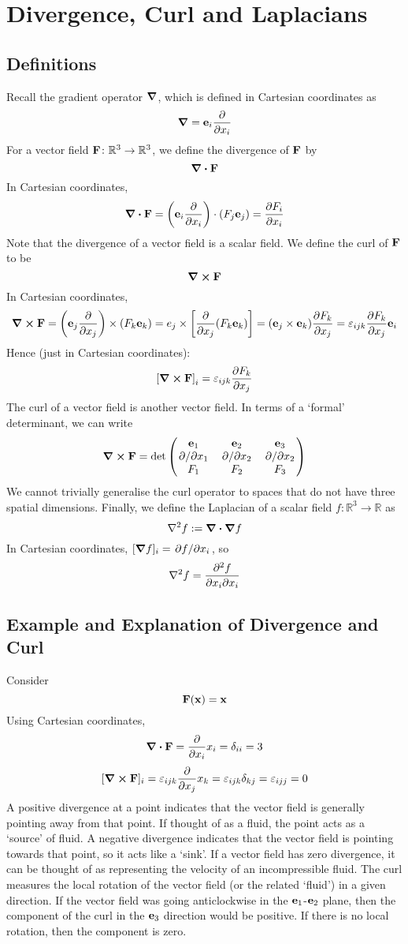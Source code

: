 \documentclass{article}
\begin{document}
\section{Divergence, Curl and Laplacians}
\subsection{Definitions}
Recall the gradient operator $\grad$, which is defined in Cartesian coordinates as
\[ \grad = \vb e_i \frac{\partial}{\partial x_i} \]
For a vector field $\vb F \colon \mathbb R^3 \to \mathbb R^3$, we define the divergence of $\vb F$ by
\[ \div{\vb F} \]
In Cartesian coordinates,
\[ \div{\vb F} = \left( \vb e_i \frac{\partial}{\partial x_i} \right) \cdot (F_j \vb e_j) = \pdv{F_i}{x_i} \]
Note that the divergence of a vector field is a scalar field. We define the curl of $\vb{F}$ to be
\[ \curl{\vb F} \]
In Cartesian coordinates,
\[ \curl{\vb F} = \left( \vb e_j \pdv{x_j} \right) \times (F_k \vb e_k) = e_j \times \left[ \pdv{x_j}(F_k \vb e_k) \right] = (\vb e_j \times \vb e_k) \pdv{F_k}{x_j} = \varepsilon_{ijk} \pdv{F_k}{x_j}\vb e_i \]
Hence (just in Cartesian coordinates):
\[ \left[ \curl{\vb F} \right]_i = \varepsilon_{ijk} \pdv{F_k}{x_j} \]
The curl of a vector field is another vector field. In terms of a `formal' determinant, we can write
\[ \curl{\vb F} = \det \begin{pmatrix}
        \vb e_1    & \vb e_2    & \vb e_3    \\
        \pdv*{x_1} & \pdv*{x_2} & \pdv*{x_2} \\
        F_1        & F_2        & F_3
    \end{pmatrix} \]
We cannot trivially generalise the curl operator to spaces that do not have three spatial dimensions. Finally, we define the Laplacian of a scalar field $f \colon \mathbb R^3 \to \mathbb R$ as
\[ \laplacian{f} := \div{\grad{f}} \]
In Cartesian coordinates, $[\grad{f}]_i = \pdv*{f}{x_i}$, so
\[ \laplacian{f} = \pdv{f}{x_i}{x_i} \]

\subsection{Example and Explanation of Divergence and Curl}
Consider
\[ \vb F(\vb x) = \vb x \]
Using Cartesian coordinates,
\[ \div{\vb F} = \pdv{x_i}x_i = \delta_{ii} = 3 \]
\[ [\curl{\vb F}]_i = \varepsilon_{ijk} \pdv{x_j} x_k = \varepsilon_{ijk} \delta_{kj} = \varepsilon_{ijj} = 0 \]
A positive divergence at a point indicates that the vector field is generally pointing away from that point. If thought of as a fluid, the point acts as a `source' of fluid. A negative divergence indicates that the vector field is pointing towards that point, so it acts like a `sink'. If a vector field has zero divergence, it can be thought of as representing the velocity of an incompressible fluid. The curl measures the local rotation of the vector field (or the related `fluid') in a given direction. If the vector field was going anticlockwise in the $\vb e_1$-$\vb e_2$ plane, then the component of the curl in the $\vb e_3$ direction would be positive. If there is no local rotation, then the component is zero.
\end{document}

